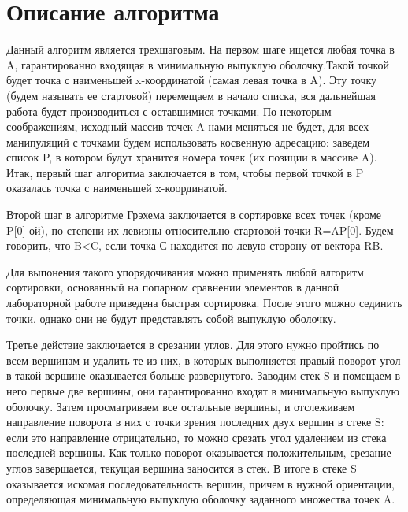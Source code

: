 \documentclass{report}
\begin{document}
\section*{Описание алгоритма}
Данный алгоритм является трехшаговым. На первом шаге ищется любая точка в A, гарантированно входящая в минимальную выпуклую оболочку.Такой точкой будет точка с наименьшей x-координатой (самая левая точка в A). Эту точку (будем называть ее стартовой) перемещаем в начало списка, вся дальнейшая работа будет производиться с оставшимися точками. По некоторым соображениям, исходный массив точек A нами меняться не будет, для всех манипуляций с точками будем использовать косвенную адресацию: заведем список P, в котором будут хранится номера точек (их позиции в массиве A). Итак, первый шаг алгоритма заключается в том, чтобы первой точкой в P оказалась точка с наименьшей x-координатой.
\par 
Второй шаг в алгоритме Грэхема заключается в сортировке всех точек (кроме P[0]-ой), по степени их левизны относительно стартовой точки R=AP[0]. Будем говорить, что B<C, если точка С находится по левую сторону от вектора RB.
\par 
Для выпонения такого упорядочивания можно применять любой алгоритм сортировки, основанный на попарном сравнении элементов в данной лабораторной работе приведена быстрая сортировка. После этого можно сединить точки, однако они не будут представлять собой выпуклую оболочку.
\par
Третье действие заключается в срезании углов. Для этого нужно пройтись по всем вершинам и удалить те из них, в которых выполняется правый поворот угол в такой вершине оказывается больше развернутого. Заводим стек S и помещаем в него первые две вершины, они гарантированно входят в минимальную выпуклую оболочку. Затем просматриваем все остальные вершины, и отслеживаем направление поворота в них с точки зрения последних двух вершин в стеке S: если это направление отрицательно, то можно срезать угол удалением из стека последней вершины. Как только поворот оказывается положительным, срезание углов завершается, текущая вершина заносится в стек. В итоге в стеке S оказывается искомая последовательность вершин, причем в нужной ориентации, определяющая минимальную выпуклую оболочку заданного множества точек A.
\newpage

\end{document}
